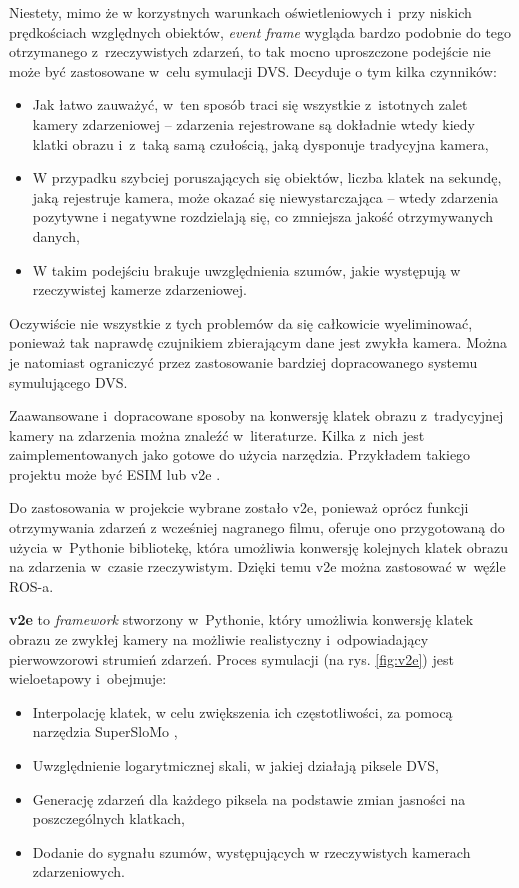 Niestety, mimo że w korzystnych warunkach oświetleniowych i~przy niskich prędkościach względnych obiektów, \textit{event frame} wygląda bardzo podobnie do tego otrzymanego z~rzeczywistych zdarzeń, to tak mocno uproszczone podejście nie może być zastosowane w~celu symulacji DVS. Decyduje o tym kilka czynników:
\begin{itemize}
    \item Jak łatwo zauważyć, w~ten sposób traci się wszystkie z~istotnych zalet kamery zdarzeniowej -- zdarzenia rejestrowane są dokładnie wtedy kiedy klatki obrazu i~z~taką samą czułością, jaką dysponuje tradycyjna kamera,
    \item W przypadku szybciej poruszających się obiektów, liczba klatek na sekundę, jaką rejestruje kamera, może okazać się niewystarczająca -- wtedy zdarzenia pozytywne i negatywne rozdzielają się, co zmniejsza jakość otrzymywanych danych,
    \item W takim podejściu brakuje uwzględnienia szumów, jakie występują w rzeczywistej kamerze zdarzeniowej.
\end{itemize}

Oczywiście nie wszystkie z tych problemów da się całkowicie wyeliminować, ponieważ tak naprawdę czujnikiem zbierającym dane jest zwykła kamera. Można je natomiast ograniczyć przez zastosowanie bardziej dopracowanego systemu symulującego DVS.

\vspace{11px}

Zaawansowane i~dopracowane sposoby na konwersję klatek obrazu z~tradycyjnej kamery na zdarzenia można znaleźć w~literaturze. Kilka z~nich jest zaimplementowanych jako gotowe do użycia narzędzia. Przykładem takiego projektu może być ESIM \cite{ESIM} lub v2e \cite{v2e}.

Do zastosowania w projekcie wybrane zostało v2e, ponieważ oprócz funkcji otrzymywania zdarzeń z wcześniej nagranego filmu, oferuje ono przygotowaną do użycia w~Pythonie bibliotekę, która umożliwia konwersję kolejnych klatek obrazu na zdarzenia w~czasie rzeczywistym. Dzięki temu v2e można zastosować w~węźle ROS-a. 

\textbf{v2e} to \textit{framework} stworzony w~Pythonie, który umożliwia konwersję klatek obrazu ze zwykłej kamery na możliwie realistyczny i~odpowiadający pierwowzorowi strumień zdarzeń. Proces symulacji (na rys. \ref{fig:v2e}) jest wieloetapowy i~obejmuje:
\begin{itemize}
    \item Interpolację klatek, w celu zwiększenia ich częstotliwości, za pomocą narzędzia SuperSloMo \cite{SuperSloMo},
    \item Uwzględnienie logarytmicznej skali, w jakiej działają piksele DVS,
    \item Generację zdarzeń dla każdego piksela na podstawie zmian jasności na poszczególnych klatkach,
    \item Dodanie do sygnału szumów, występujących w rzeczywistych kamerach zdarzeniowych.
\end{itemize}

